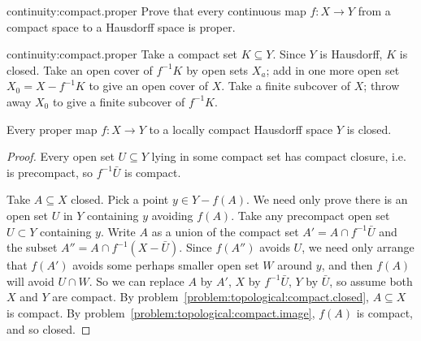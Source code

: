 \begin{problem}{continuity:compact.proper}
Prove that every continuous map \(f\colon X\to Y\) from a compact space to a Hausdorff space is proper.
\end{problem}
\begin{answer}{continuity:compact.proper}
Take a compact set \(K\subseteq Y\).
Since \(Y\) is Hausdorff, \(K\) is closed.
Take an open cover of \(f^{-1}K\) by open sets \(X_a\); add in one more open set \(X_0=X-f^{-1}K\) to give an open cover of \(X\).
Take a finite subcover of \(X\); throw away \(X_0\) to give a finite subcover of \(f^{-1}K\).
\end{answer}
\begin{lemma}\label{lemma:proper.closed}
Every proper map \(f\colon X\to Y\) to a locally compact Hausdorff space \(Y\) is closed.
\end{lemma}
\begin{proof}
Every open set \(U\subseteq Y\) lying in some compact set has compact closure, i.e. is precompact, so \(f^{-1}\bar{U}\) is compact.

Take \(A\subseteq X\) closed.
Pick a point \(y \in Y-f(A)\).
We need only prove there is an open set \(U\) in \(Y\) containing \(y\) avoiding \(f(A)\).
Take any precompact open set \(U\subset Y\) containing \(y\).
Write \(A\) as a union of the compact set \(A'=A\cap f^{-1}\bar{U}\) and the subset \(A''=A\cap f^{-1}(X-\bar{U})\).
Since \(f(A'')\) avoids \(U\), we need only arrange that \(f(A')\) avoids some perhaps smaller open set \(W\) around \(y\), and then \(f(A)\) will avoid \(U\cap W\).
So we can replace \(A\) by \(A'\), \(X\) by \(f^{-1}\bar{U}\), \(Y\) by \(\bar{U}\), so assume both \(X\) and \(Y\) are compact.
By problem~\vref{problem:topological:compact.closed}, \(A\subseteq X\) is compact.
By problem~\vref{problem:topological:compact.image}, \(f(A)\) is compact, and so closed.
\end{proof}

